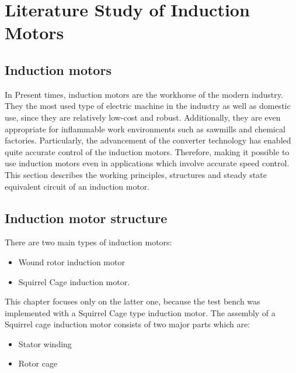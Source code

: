 
\chapter{Literature Study of Induction Motors} %
\label{Literature Study of Induction Motors}

\section{Induction motors}
In Present times, induction motors are the workhorse of the modern industry. They the most used type of electric machine in the industry as well as domestic use, since they are relatively low-cost and robust. Additionally, they are even appropriate for inflammable work environments such as sawmills and chemical factories\cite{esenozdemir2016}. Particularly, the advancement of the converter technology has enabled quite accurate control of the induction motors. Therefore, making it possible to use induction motors even in applications which involve accurate speed control. This section describes the working principles, structures and steady state equivalent circuit of an induction motor.

\section{Induction motor structure}
There are two main types of induction motors: 
\begin{itemize}
	\item Wound rotor induction motor 
	\item Squirrel Cage induction motor. 
\end{itemize}

This chapter focuses only on the latter one, because the test bench was implemented with a Squirrel Cage type induction motor. The assembly of a Squirrel cage induction motor consists of two major parts which are:
\begin{itemize}
	\item Stator winding 
	\item Rotor cage
\end{itemize}

